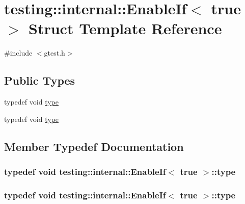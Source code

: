 \hypertarget{structtesting_1_1internal_1_1_enable_if_3_01true_01_4}{\section{testing\-:\-:internal\-:\-:Enable\-If$<$ true $>$ Struct Template Reference}
\label{structtesting_1_1internal_1_1_enable_if_3_01true_01_4}
}


{\ttfamily \#include $<$gtest.\-h$>$}

\subsection*{Public Types}
\begin{DoxyCompactItemize}
\item 
typedef void \hyperlink{structtesting_1_1internal_1_1_enable_if_3_01true_01_4_a9398d803f1fdd99ff41823746f6299ff}{type}
\item 
typedef void \hyperlink{structtesting_1_1internal_1_1_enable_if_3_01true_01_4_a9398d803f1fdd99ff41823746f6299ff}{type}
\end{DoxyCompactItemize}


\subsection{Member Typedef Documentation}
\hypertarget{structtesting_1_1internal_1_1_enable_if_3_01true_01_4_a9398d803f1fdd99ff41823746f6299ff}{
\subsubsection[{type}]{\setlength{\rightskip}{0pt plus 5cm}typedef void {\bf testing\-::internal\-::\-Enable\-If}$<$ true $>$\-::{\bf type}}}\label{structtesting_1_1internal_1_1_enable_if_3_01true_01_4_a9398d803f1fdd99ff41823746f6299ff}
\hypertarget{structtesting_1_1internal_1_1_enable_if_3_01true_01_4_a9398d803f1fdd99ff41823746f6299ff}{
\subsubsection[{type}]{\setlength{\rightskip}{0pt plus 5cm}typedef void {\bf testing\-::internal\-::\-Enable\-If}$<$ true $>$\-::{\bf type}}}\label{structtesting_1_1internal_1_1_enable_if_3_01true_01_4_a9398d803f1fdd99ff41823746f6299ff}


